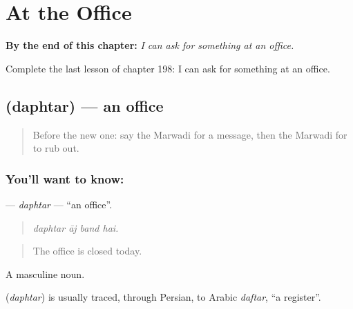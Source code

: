
\chapter{At the Office}
\label{ch:mw-at-the-office}

\begin{chapteropening}
\textbf{By the end of this chapter:} \emph{I can ask for something at an office.}

Complete the last lesson of chapter 198: I can ask for something at an office.
\end{chapteropening}

\section[\texorpdfstring{\mw{दफ्तर} (daphtar)}{दफ्तर (daphtar)}]{ (daphtar) — an office}

\label{lesson:MW-C198-daphtar}



\begin{quote}
Before the new one: say the Marwadi for a message, then the Marwadi for to rub out.
\end{quote}

\subsection*{You'll want to know: }
\textbf{} — \emph{daphtar} — \textquotedblleft{}an office\textquotedblright{}.

\begin{quote}
   
\end{quote}

\begin{quote}
\emph{daphtar āj band hai.}
\end{quote}

\begin{quote}
The office is closed today.
\end{quote}

A masculine noun.

\begin{cousinweb}
\textbf{} (\emph{daphtar}) is usually traced, through Persian, to Arabic \emph{daftar}, \textquotedblleft{}a register\textquotedblright{}.
\end{cousinweb}

